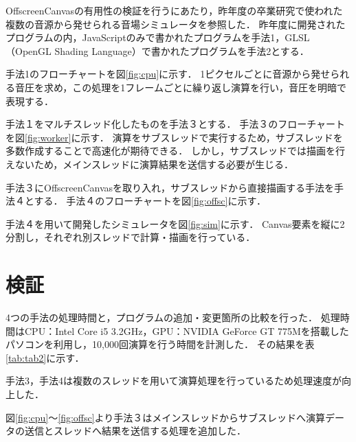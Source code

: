 \documentclass[twocolumn,10pt,a4j]{jsarticle}
\begin{document}
OffscreenCanvasの有用性の検証を行うにあたり，昨年度の卒業研究で使われた複数の音源から発せられる音場シミュレータを参照した．
昨年度に開発されたプログラムの内，JavaScriptのみで書かれたプログラムを手法1，GLSL（OpenGL Shading Language）で書かれたプログラムを手法2とする．

手法1のフローチャートを図\ref{fig:cpu}に示す．
1ピクセルごとに音源から発せられる音圧を求め，この処理を1フレームごとに繰り返し演算を行い，音圧を明暗で表現する．

手法１をマルチスレッド化したものを手法３とする．
手法３のフローチャートを図\ref{fig:worker}に示す．
演算をサブスレッドで実行するため，サブスレッドを多数作成することで高速化が期待できる．
しかし，サブスレッドでは描画を行えないため，メインスレッドに演算結果を送信する必要が生じる．

手法３にOffscreenCanvasを取り入れ，サブスレッドから直接描画する手法を手法４とする．
手法４のフローチャートを図\ref{fig:offsc}に示す．


手法４を用いて開発したシミュレータを図\ref{fig:sim}に示す．
Canvas要素を縦に2分割し，それぞれ別スレッドで計算・描画を行っている．

%
%


\section{検証}
4つの手法の処理時間と，プログラムの追加・変更箇所の比較を行った．
処理時間はCPU：Intel Core i5 3.2GHz，GPU：NVIDIA GeForce GT 775Mを搭載したパソコンを利用し，10,000回演算を行う時間を計測した．
その結果を表\ref{tab:tab2}に示す．

手法3，手法4は複数のスレッドを用いて演算処理を行っているため処理速度が向上した．

%
図\ref{fig:cpu}〜\ref{fig:offsc}より手法３はメインスレッドからサブスレッドへ演算データの送信とスレッドへ結果を送信する処理を追加した．
\end{document}
